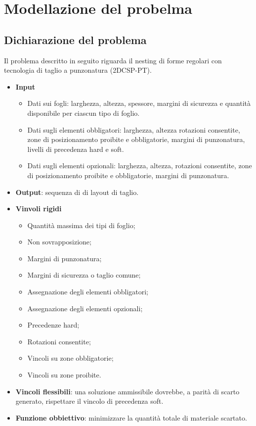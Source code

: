 \chapter{Modellazione del probelma}
\label{cap:analisi-requisiti}


\section{Dichiarazione del problema}

Il problema descritto in seguito riguarda il nesting di forme regolari con tecnologia di taglio a punzonatura (2DCSP-PT).

\begin{itemize}
    \item \textbf{Input}
    \begin{itemize}
        \item Dati sui fogli: larghezza, altezza, spessore, margini di sicurezza e quantità disponibile per ciascun tipo di foglio.
        \item Dati sugli elementi obbligatori: larghezza, altezza rotazioni consentite, zone di posizionamento proibite e obbligatorie, margini di punzonatura, livelli di precedenza hard e soft.
        \item Dati sugli elementi opzionali: larghezza, altezza, rotazioni consentite, zone di posizionamento proibite e obbligatorie, margini di punzonatura.
    \end{itemize}
    \item \textbf{Output}: sequenza di di layout di taglio.
    \item \textbf{Vinvoli rigidi}
    \begin{itemize}
        \item Quantità massima dei tipi di foglio;
        \item Non sovrapposizione;
        \item Margini di punzonatura;
        \item Margini di sicurezza o taglio comune;
        \item Assegnazione degli elementi obbligatori;
        \item Assegnazione degli elementi opzionali;
        \item Precedenze hard;
        \item Rotazioni consentite;
        \item Vincoli su zone obbligatorie;
        \item Vincoli su zone proibite.
    \end{itemize}
    \item \textbf{Vincoli flessibili}: una soluzione ammissibile dovrebbe, a parità di scarto generato, rispettare il vincolo di precedenza soft.
    \item \textbf{Funzione obbiettivo}: minimizzare la quantità totale di materiale scartato.
\end{itemize}

